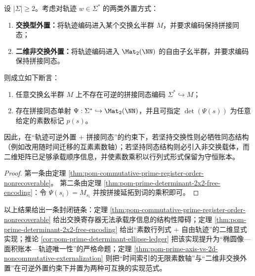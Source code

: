 \begin{theorem}\label{thm:pom-prime-axis-vs-2d-noncommutative-externalization}
设 \(|\Sigma|\ge 2\)。考虑对轨迹 \(w\in\Sigma^{*}\) 的两类外置方式：
\begin{enumerate}
  \item \textbf{交换型外置：}将轨迹编码进入某个交换幺半群 \(M\)，并要求编码保持拼接同态；
  \item \textbf{二维非交换外置：}将轨迹编码进入 \(\Mat_{2}(\NN)\) 的自由子幺半群，并要求编码保持拼接同态。
\end{enumerate}
则成立如下断言：
\begin{enumerate}
  \item 任意交换幺半群 \(M\) 上不存在可逆的拼接同态编码 \(\Sigma^{*}\hookrightarrow M\)；
  \item 存在拼接同态单射 \(\Psi:\Sigma^{*}\hookrightarrow\Mat_{2}(\NN)\)，并且可指定 \(\det(\Psi(s))\) 为任意给定的素数标记 \(p(s)\)。
\end{enumerate}
因此，在“轨迹可逆外置 + 拼接同态”的约束下，若坚持交换性则必牺牲同态结构（例如改用随时间迁移的互素素数轴）；若坚持同态结构则必引入非交换载体，而二维矩阵已足够承载顺序信息，并使素数乘积以行列式形式保留为守恒账本。
\end{theorem}
\begin{proof}
第一条由定理 \ref{thm:pom-commutative-prime-register-order-nonrecoverable}。
第二条由定理 \ref{thm:pom-prime-determinant-2x2-free-encoding}：令 \(\Psi(s_i)=M_{s_i}\) 并按拼接延拓到词的乘积即可。
\end{proof}

以上结果给出一条封闭链条：定理 \ref{thm:pom-commutative-prime-register-order-nonrecoverable} 给出交换寄存器无法承载序信息的结构性障碍；定理 \ref{thm:pom-prime-determinant-2x2-free-encoding} 给出“素数行列式 + 自由轨迹”的二维显式实现；推论 \ref{cor:pom-prime-determinant-ellipse-ledger} 把该实现提升为“椭圆像—面积账本—轨迹唯一性”的严格命题；定理 \ref{thm:pom-prime-axis-vs-2d-noncommutative-externalization} 则把“时间索引的无限素数轴”与“二维非交换外置”在可逆外置约束下并置为两种可互换的实现范式。
